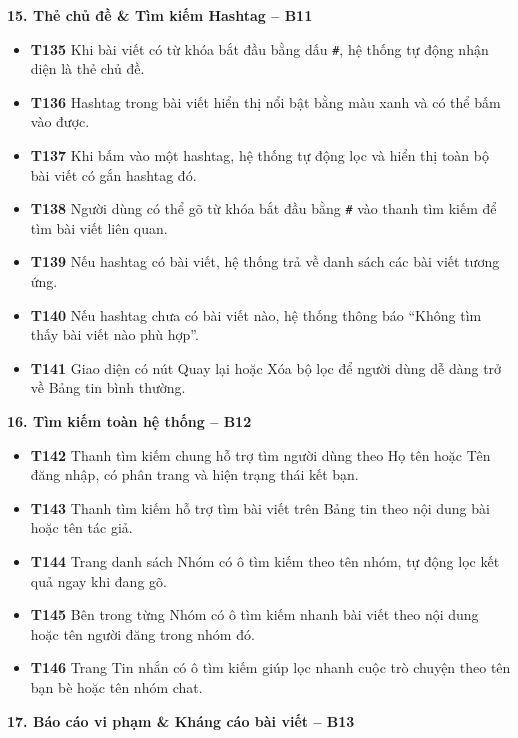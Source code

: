 \documentclass[11pt,a4paper]{article}
\begin{document}
\smallskip
\noindent\textbf{15. Thẻ chủ đề \& Tìm kiếm Hashtag -- B11}
\begin{itemize}[leftmargin=0.9cm, label=$\bullet$, itemsep=2pt, topsep=4pt]
    \item \textbf{T135} Khi bài viết có từ khóa bắt đầu bằng dấu \texttt{\#}, hệ thống tự động nhận diện là thẻ chủ đề.
    \item \textbf{T136} Hashtag trong bài viết hiển thị nổi bật bằng màu xanh và có thể bấm vào được.
    \item \textbf{T137} Khi bấm vào một hashtag, hệ thống tự động lọc và hiển thị toàn bộ bài viết có gắn hashtag đó.
    \item \textbf{T138} Người dùng có thể gõ từ khóa bắt đầu bằng \texttt{\#} vào thanh tìm kiếm để tìm bài viết liên quan.
    \item \textbf{T139} Nếu hashtag có bài viết, hệ thống trả về danh sách các bài viết tương ứng.
    \item \textbf{T140} Nếu hashtag chưa có bài viết nào, hệ thống thông báo ``Không tìm thấy bài viết nào phù hợp''.
    \item \textbf{T141} Giao diện có nút Quay lại hoặc Xóa bộ lọc để người dùng dễ dàng trở về Bảng tin bình thường.
\end{itemize}
\smallskip
\noindent\textbf{16. Tìm kiếm toàn hệ thống -- B12}
\begin{itemize}[leftmargin=0.9cm, label=$\bullet$, itemsep=2pt, topsep=4pt]
    \item \textbf{T142} Thanh tìm kiếm chung hỗ trợ tìm người dùng theo Họ tên hoặc Tên đăng nhập, có phân trang và hiện trạng thái kết bạn.
    \item \textbf{T143} Thanh tìm kiếm hỗ trợ tìm bài viết trên Bảng tin theo nội dung bài hoặc tên tác giả.
    \item \textbf{T144} Trang danh sách Nhóm có ô tìm kiếm theo tên nhóm, tự động lọc kết quả ngay khi đang gõ.
    \item \textbf{T145} Bên trong từng Nhóm có ô tìm kiếm nhanh bài viết theo nội dung hoặc tên người đăng trong nhóm đó.
    \item \textbf{T146} Trang Tin nhắn có ô tìm kiếm giúp lọc nhanh cuộc trò chuyện theo tên bạn bè hoặc tên nhóm chat.
\end{itemize}
\smallskip
\noindent\textbf{17. Báo cáo vi phạm \& Kháng cáo bài viết -- B13}
\end{document}
